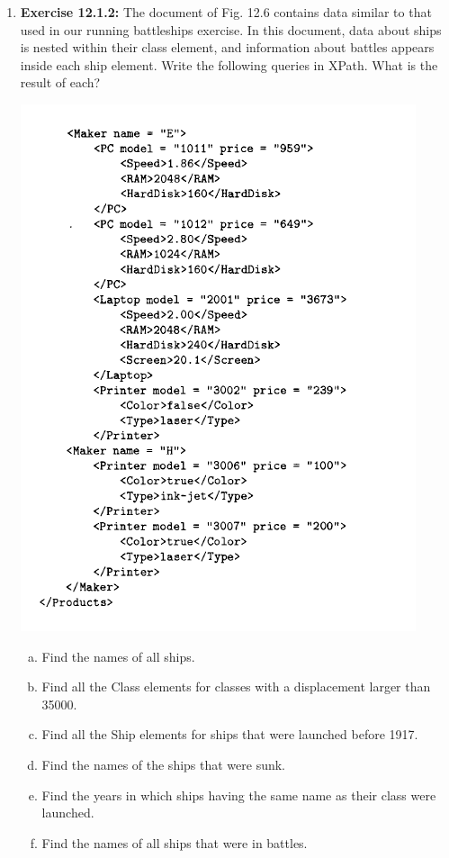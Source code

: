 \documentclass[12pt]{article}
\begin{document}
\begin{enumerate}[1.]
    \item \textbf{Exercise 12.1.2:} The document of Fig. 12.6 contains data similar to that
    used in our running battleships exercise. In this document, data about ships is
    nested within their class element, and information about battles appears inside
    each ship element. Write the following queries in XPath. What is the result of
    each?

    \begin{center}
    \includegraphics[width=0.7\linewidth]{images/worksheet_10_1.png}
    \end{center}

    \bigskip

    \begin{enumerate}[a)]
        \item Find the names of all ships.
        \item Find all the Class elements for classes with a displacement larger than 35000.
        \item Find all the Ship elements for ships that were launched before 1917.
        \item Find the names of the ships that were sunk.
        \item Find the years in which ships having the same name as their class were launched.
        \item Find the names of all ships that were in battles.
    \end{enumerate}


\end{enumerate}
\end{document}

